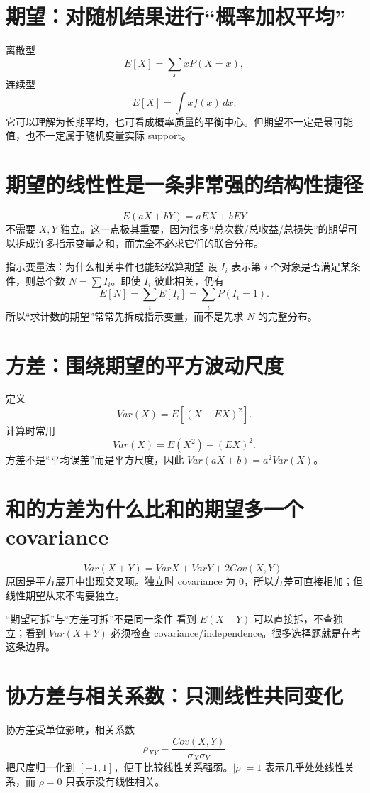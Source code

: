 \documentclass[11pt,a4paper,openany]{ctexbook}
\begin{document}
\section{期望：对随机结果进行“概率加权平均”}
离散型
\[
E[X]=\sum_xxP(X=x),
\]
连续型
\[
E[X]=\int xf(x)\,dx.
\]
它可以理解为长期平均，也可看成概率质量的平衡中心。但期望不一定是最可能值，也不一定属于随机变量实际 support。

\section{期望的线性性是一条非常强的结构性捷径}
\[
E(aX+bY)=aEX+bEY
\]
不需要 $X,Y$ 独立。这一点极其重要，因为很多“总次数/总收益/总损失”的期望可以拆成许多指示变量之和，而完全不必求它们的联合分布。

\begin{examplebox}{指示变量法：为什么相关事件也能轻松算期望}
设 $I_i$ 表示第 $i$ 个对象是否满足某条件，则总个数 $N=\sum I_i$。即使 $I_i$ 彼此相关，仍有
\[
E[N]=\sum_iE[I_i]=\sum_iP(I_i=1).
\]
所以“求计数的期望”常常先拆成指示变量，而不是先求 $N$ 的完整分布。
\end{examplebox}

\section{方差：围绕期望的平方波动尺度}
定义
\[
Var(X)=E[(X-EX)^2].
\]
计算时常用
\[
Var(X)=E(X^2)-(EX)^2.
\]
方差不是“平均误差”而是平方尺度，因此 $Var(aX+b)=a^2Var(X)$。

\section{和的方差为什么比和的期望多一个 covariance}
\[
Var(X+Y)=VarX+VarY+2Cov(X,Y).
\]
原因是平方展开中出现交叉项。独立时 covariance 为 0，所以方差可直接相加；但线性期望从来不需要独立。

\begin{boundarybox}{“期望可拆”与“方差可拆”不是同一条件}
看到 $E(X+Y)$ 可以直接拆，不查独立；看到 $Var(X+Y)$ 必须检查 covariance/independence。很多选择题就是在考这条边界。
\end{boundarybox}

\section{协方差与相关系数：只测线性共同变化}
协方差受单位影响，相关系数
\[
\rho_{XY}=\frac{Cov(X,Y)}{\sigma_X\sigma_Y}
\]
把尺度归一化到 $[-1,1]$，便于比较线性关系强弱。$|\rho|=1$ 表示几乎处处线性关系，而 $\rho=0$ 只表示没有线性相关。
\end{document}
